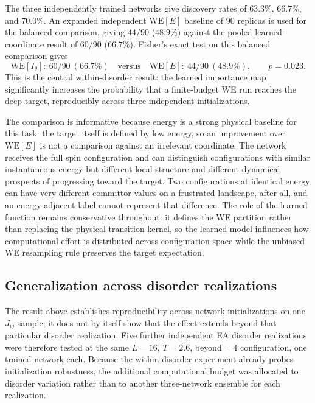\documentclass[a4paper,fleqn]{cas-sc}
\newcommand{\WE}{\mathrm{WE}}
\begin{document}
The three independently trained networks give discovery rates of $63.3\%$, $66.7\%$, and
$70.0\%$. An expanded independent $\WE[E]$ baseline of $90$ replicas is used for the balanced
comparison, giving $44/90$ ($48.9\%$) against the pooled learned-coordinate result of $60/90$
($66.7\%$). Fisher's exact test on this balanced comparison gives
\begin{equation}
\WE[I_\theta]:\ 60/90\ (66.7\%)\quad\text{versus}\quad\WE[E]:\ 44/90\ (48.9\%),\qquad p=0.023.
\label{eq:withinp}
\end{equation}
This is the central within-disorder result: the learned importance map significantly increases
the probability that a finite-budget WE run reaches the deep target, reproducibly across three
independent initializations.

The comparison is informative because energy is a strong physical baseline for this task: the
target itself is defined by low energy, so an improvement over $\WE[E]$ is not a comparison
against an irrelevant coordinate. The network receives the full spin configuration and can
distinguish configurations with similar instantaneous energy but different local structure and
different dynamical prospects of progressing toward the target. Two configurations at
identical energy can have very different committor values on a frustrated landscape, after
all, and an energy-adjacent label cannot represent that difference. The role of the learned
function remains conservative throughout: it defines the WE partition rather than replacing
the physical transition kernel, so the learned model influences how computational effort is
distributed across configuration space while the unbiased WE resampling rule preserves the
target expectation.

\subsection{Generalization across disorder realizations}\label{sec:disordergen}
The result above establishes reproducibility across network initializations on one $J_{ij}$
sample; it does not by itself show that the effect extends beyond that particular disorder
realization. Five further independent EA disorder realizations were therefore tested at the same
$L=16$, $T=2.6$, beyond$=4$ configuration, one trained network each. Because the
within-disorder experiment already probes initialization robustness, the additional computational
budget was allocated to disorder variation rather than to another three-network ensemble for
each realization.
\end{document}
